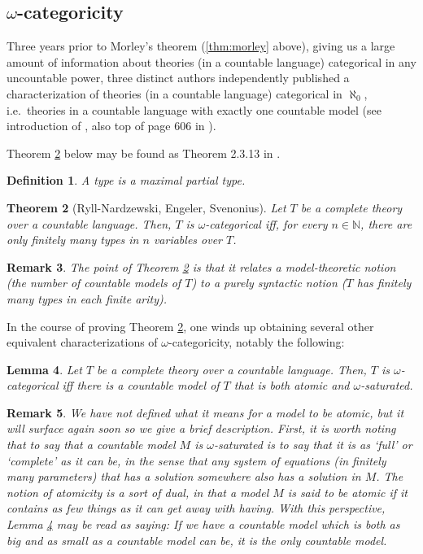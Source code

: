 \documentclass{article}
\newtheorem{theorem}{Theorem}[section]
\newtheorem{lemma}[theorem]{Lemma}
\newtheorem{remark}[theorem]{Remark}
\newtheorem{definition}[theorem]{Definition}
\theoremstyle{nonumberplain}
\newcommand{\N}{\mathbb{N}}
\begin{document}
\subsection{$\omega$-categoricity}\label{sec:omega}

Three years prior to Morley's theorem (\ref{thm:morley} above), giving us a large amount of information about theories (in a countable language) categorical in any uncountable power, three distinct authors independently published a characterization of theories (in a countable language) categorical in $\aleph_0$, i.e.\ theories in a countable language with exactly one countable model (see introduction of \cite{primersimpletheories}, also top of page 606 in \cite{cnk}).

Theorem \ref{thm:omegacat} below may be found as Theorem 2.3.13 in \cite{cnk}.

\begin{definition}\label{def:type}
A \emph{type} is a maximal partial type.
\end{definition}

\begin{theorem}[Ryll-Nardzewski, Engeler, Svenonius]\label{thm:omegacat}
Let $T$ be a complete theory over a countable language. Then, $T$ is $\omega$-categorical iff, for every $n \in \N$, there are only finitely many types in $n$ variables over $T$.
\end{theorem}

\begin{remark}
The point of Theorem \ref{thm:omegacat} is that it relates a model-theoretic notion (the number of countable models of $T$) to a purely syntactic notion ($T$ has finitely many types in each finite arity).
\end{remark}

In the course of proving Theorem \ref{thm:omegacat}, one winds up obtaining several other equivalent characterizations of $\omega$-categoricity, notably the following:
\begin{lemma}\label{lem:omegacat}
Let $T$ be a complete theory over a countable language. Then, $T$ is $\omega$-categorical iff there is a countable model of $T$ that is both atomic and $\omega$-saturated.
\end{lemma}

\begin{remark}\label{rmk:atomic}
We have not defined what it means for a model to be atomic, but it will surface again soon so we give a brief description. First, it is worth noting that to say that a countable model $M$ is $\omega$-saturated is to say that it is as `full' or `complete' as it can be, in the sense that any system of equations (in finitely many parameters) that has a solution somewhere also has a solution in $M$. The notion of atomicity is a sort of dual, in that a model $M$ is said to be atomic if it contains as few things as it can get away with having. With this perspective, Lemma \ref{lem:omegacat} may be read as saying: If we have a countable model which is both as big and as small as a countable model can be, it is the only countable model.
\end{remark}
\end{document}
